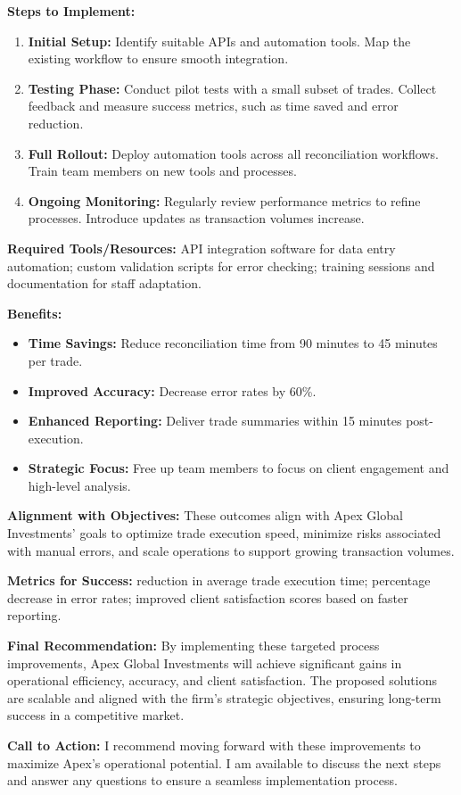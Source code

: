 \documentclass[11pt]{article}
\begin{document}
\begin{tcolorbox}[enhanced, colback=boxgray, frame hidden, arc=2mm,
    left=5mm, right=5mm, top=4mm, bottom=4mm, breakable]
\textbf{Steps to Implement:}
\begin{enumerate}[leftmargin=1.5em, itemsep=2pt]
  \item \textbf{Initial Setup:} Identify suitable APIs and automation tools.
  Map the existing workflow to ensure smooth integration.
  \item \textbf{Testing Phase:} Conduct pilot tests with a small subset of
  trades. Collect feedback and measure success metrics, such as time saved and
  error reduction.
  \item \textbf{Full Rollout:} Deploy automation tools across all
  reconciliation workflows. Train team members on new tools and processes.
  \item \textbf{Ongoing Monitoring:} Regularly review performance metrics to
  refine processes. Introduce updates as transaction volumes increase.
\end{enumerate}
\textbf{Required Tools/Resources:} API integration software for data entry
automation; custom validation scripts for error checking; training sessions
and documentation for staff adaptation.

\textbf{Benefits:}
\begin{itemize}[leftmargin=1.5em, itemsep=2pt]
  \item \textbf{Time Savings:} Reduce reconciliation time from 90 minutes to
  45 minutes per trade.
  \item \textbf{Improved Accuracy:} Decrease error rates by 60\%.
  \item \textbf{Enhanced Reporting:} Deliver trade summaries within 15 minutes
  post-execution.
  \item \textbf{Strategic Focus:} Free up team members to focus on client
  engagement and high-level analysis.
\end{itemize}
\textbf{Alignment with Objectives:} These outcomes align with Apex Global
Investments' goals to optimize trade execution speed, minimize risks
associated with manual errors, and scale operations to support growing
transaction volumes.\par\smallskip
\textbf{Metrics for Success:} reduction in average trade execution time;
percentage decrease in error rates; improved client satisfaction scores based
on faster reporting.

\textbf{Final Recommendation:} By implementing these targeted process
improvements, Apex Global Investments will achieve significant gains in
operational efficiency, accuracy, and client satisfaction. The proposed
solutions are scalable and aligned with the firm's strategic objectives,
ensuring long-term success in a competitive market.\par\smallskip
\textbf{Call to Action:} I recommend moving forward with these improvements to
maximize Apex's operational potential. I am available to discuss the next
steps and answer any questions to ensure a seamless implementation process.
\end{tcolorbox}
\end{document}
